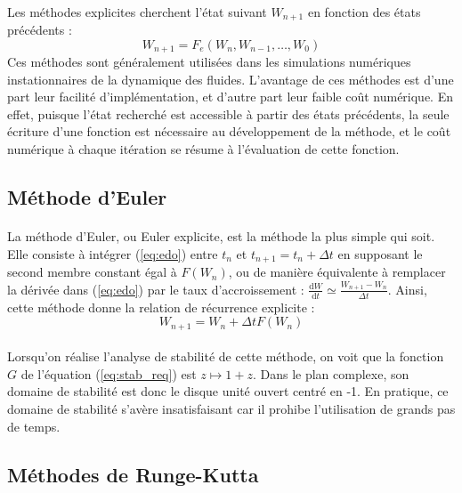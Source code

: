   \paragraph{}
  Les méthodes explicites cherchent l'état suivant $W_{n+1}$ en fonction des états précédents :
  $$W_{n+1} = F_e\left(W_n, W_{n-1}, \dots, W_0\right)$$
  Ces méthodes sont généralement utilisées dans les simulations numériques instationnaires de la dynamique des fluides.
  L'avantage de ces méthodes est d'une part leur facilité d'implémentation, et d'autre part leur faible coût numérique.
  En effet, puisque l'état recherché est accessible à partir des états précédents, la seule écriture d'une fonction est nécessaire au développement de la méthode, et le coût numérique à chaque itération se résume à l'évaluation de cette fonction.

  \subsection{Méthode d'Euler}

    \paragraph{}
    La méthode d'Euler, ou Euler explicite, est la méthode la plus simple qui soit.
    Elle consiste à intégrer (\ref{eq:edo}) entre $t_n$ et $t_{n+1} = t_n + \Delta t$ en supposant le second membre constant égal à $F\left(W_n\right)$, ou de manière équivalente à remplacer la dérivée dans (\ref{eq:edo}) par le taux d'accroissement : $\frac{\mathrm{d}W}{\mathrm{d}t}\simeq\frac{W_{n+1}-W_n}{\Delta t}$.
    Ainsi, cette méthode donne la relation de récurrence explicite :
    $$W_{n+1} = W_n + \Delta t F\left(W_n\right)$$

    \paragraph{}
    Lorsqu'on réalise l'analyse de stabilité de cette méthode, on voit que la fonction $G$ de l'équation (\ref{eq:stab_req}) est $z\mapsto 1 + z$.
    Dans le plan complexe, son domaine de stabilité est donc le disque unité ouvert centré en -1.
    En pratique, ce domaine de stabilité s'avère insatisfaisant car il prohibe l'utilisation de grands pas de temps.


  \subsection{Méthodes de Runge-Kutta}

